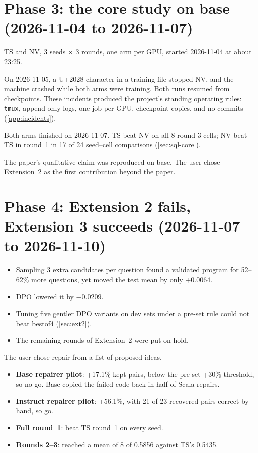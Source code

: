 \section{Phase 3: the core study on base (2026-11-04 to 2026-11-07)}

\begin{description}[style=nextline,leftmargin=1.2em]
\item[Action.] TS and NV, 3 seeds $\times$ 3 rounds, one arm per GPU, started 2026-11-04 at about 23:25.
\item[Incidents.] On 2026-11-05, a U+2028 character in a training file stopped NV, and the machine crashed while both
arms were training. Both runs resumed from checkpoints. These incidents produced the project's standing operating
rules: \texttt{tmux}, append-only logs, one job per GPU, checkpoint copies, and no commits (\cref{app:incidents}).
\item[Result.] Both arms finished on 2026-11-07. TS beat NV on all 8 round-3 cells; NV beat TS in round~1 in 17 of 24
seed--cell comparisons (\cref{sec:sql-core}).
\item[Consequence.] The paper's qualitative claim was reproduced on base. The user chose Extension~2 as the first
contribution beyond the paper.
\end{description}

\section{Phase 4: Extension 2 fails, Extension 3 succeeds (2026-11-07 to 2026-11-10)}

\begin{description}[style=nextline,leftmargin=1.2em]
\item[Extension 2 (bestof4, DPO).]
  \begin{itemize}
  \item Sampling 3 extra candidates per question found a validated program for 52--62\% more questions, yet moved the
  test mean by only $+0.0064$.
  \item DPO lowered it by $-0.0209$.
  \item Tuning five gentler DPO variants on dev sets under a pre-set rule could not beat bestof4 (\cref{sec:ext2}).
  \item The remaining rounds of Extension~2 were put on hold.
  \end{itemize}
\item[Extension 3 (repair).] The user chose repair from a list of proposed ideas.
  \begin{itemize}
  \item \textbf{Base repairer pilot}: +17.1\% kept pairs, below the pre-set +30\% threshold, so no-go. Base copied the
  failed code back in half of Scala repairs.
  \item \textbf{Instruct repairer pilot}: +56.1\%, with 21 of 23 recovered pairs correct by hand, so go.
  \item \textbf{Full round~1}: beat TS round~1 on every seed.
  \item \textbf{Rounds 2--3}: reached a mean of 8 of 0.5856 against TS's 0.5435.
  \end{itemize}
\end{description}

